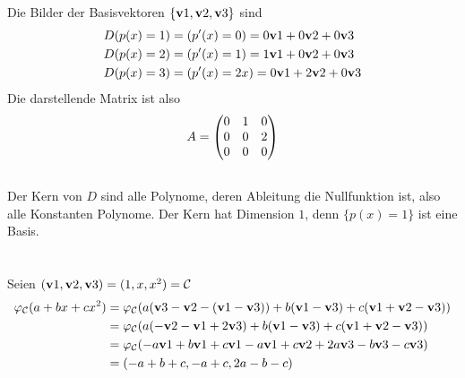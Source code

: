 \documentclass{../mfa}
\begin{document}
\subsection{}
Die Bilder der Basisvektoren $\{\mathbf{v}{1}, \mathbf{v}{2}, \mathbf{v}{3}\}$ sind
\begin{align*}
   D(p(x)=1) &= (p^\prime(x) = 0) = 0\mathbf{v}{1} + 0\mathbf{v}{2} + 0\mathbf{v}{3}\\
   D(p(x)=2) &= (p^\prime(x) = 1) = 1\mathbf{v}{1} + 0\mathbf{v}{2} + 0\mathbf{v}{3}\\
   D(p(x)=3) &= (p^\prime(x) = 2x) = 0\mathbf{v}{1} + 2\mathbf{v}{2} + 0\mathbf{v}{3}\\
\end{align*}
Die darstellende Matrix ist also
\begin{equation*}
   A = \begin{pmatrix}0 & 1 & 0 \\ 0 & 0 & 2 \\ 0 & 0 & 0\end{pmatrix}
\end{equation*}

\subsection{}
Der Kern von $D$ sind alle Polynome, deren Ableitung die Nullfunktion ist, also
alle Konstanten Polynome. Der Kern hat Dimension $1$, denn $\{p(x)=1\}$ ist eine
Basis.

\section{}

Seien $(\mathbf{v}{1}, \mathbf{v}{2}, \mathbf{v}{3}) = (1,x,x^2) = \mathcal{C}$
\begin{align*}
   \varphi_\mathcal{C}(a + bx +cx^2) & = \varphi_\mathcal{C}(a(\mathbf{v}{3} - \mathbf{v}{2} - (\mathbf{v}{1} - \mathbf{v}{3})) + b(\mathbf{v}{1} - \mathbf{v}{3}) + c(\mathbf{v}{1} + \mathbf{v}{2} - \mathbf{v}{3})) \\
                                     & = \varphi_\mathcal{C}(a(-\mathbf{v}{2} - \mathbf{v}{1} +
   2\mathbf{v}{3}) + b(\mathbf{v}{1} - \mathbf{v}{3}) + c(\mathbf{v}{1} + \mathbf{v}{2} - \mathbf{v}{3})) \\
                                     & = \varphi_\mathcal{C}(-a\mathbf{v}{1} + b\mathbf{v}{1} +
   c\mathbf{v}{1} -a\mathbf{v}{1} + c\mathbf{v}{2} + 2a\mathbf{v}{3} - b\mathbf{v}{3} - c\mathbf{v}{3}) \\
                                     & = \left(-a +b +c, -a + c, 2a -b - c\right)
\end{align*}
\end{document}
